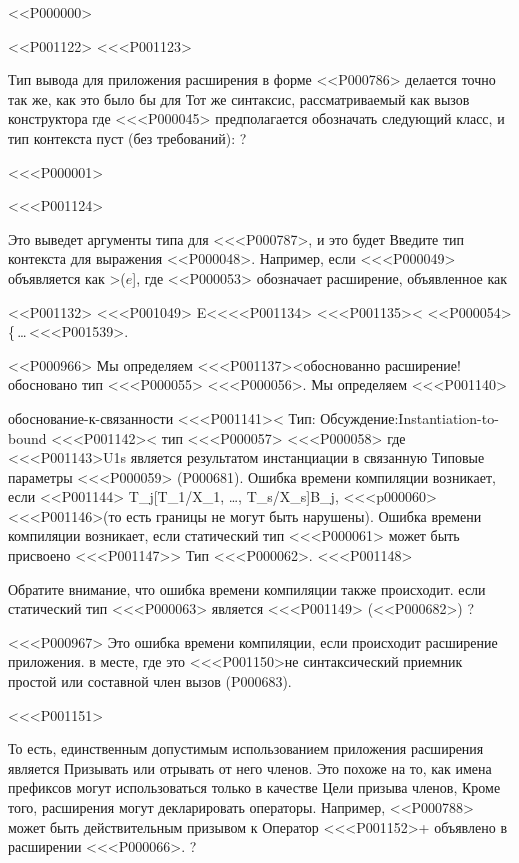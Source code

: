 {{{{{{{{{{{{{{{<<P000000>

<<P001122>
<<<P001123>{%
Тип вывода для приложения расширения
в форме <<P000786>
делается точно так же, как это было бы для
Тот же синтаксис, рассматриваемый как вызов конструктора
где <<<P000045> предполагается обозначать следующий класс,
и тип контекста пуст (без требований): %
?

<<<P000001>

<<<P001124>{%
Это выведет аргументы типа для <<<P000787>, и это будет
Введите тип контекста для выражения <<P000048>.
Например, если <<<P000049> объявляется как
>($e$],
где <<P000053> обозначает расширение, объявленное как

<<P001132>
<<<P001049>%
\EXTENSION{} E<<<<P001134> <<<P001135>< <<P000054> \{\,\ldots\,<<<P001539>.

<<P000966>%
Мы определяем
<<<P001137><обоснованно \ON{} {расширение!обосновано} \ON{} тип
<<<P000055> <<<P000056>.
Мы определяем
<<<P001140>{обоснование-к-связанности <<<P001141>< Тип: {%
Обсуждение:Instantiation-to-bound <<<P001142>< тип
<<<P000057> <<<P000058>
где <<<P001143>{U}{1}{s} является результатом инстанциации в связанную
Типовые параметры <<<P000059>
(P000681).
%
Ошибка времени компиляции возникает, если
<<P001144> T_j}{[T_1/X_1, \ldots, T_s/X_s]B_j},
<<<p000060>
<<<P001146>{(то есть границы не могут быть нарушены)}.
%
Ошибка времени компиляции возникает, если статический тип <<<P000061> может быть присвоено
<<<P001147>> Тип <<<P000062>.
<<<P001148>{%
Обратите внимание, что ошибка времени компиляции также происходит.
если статический тип <<<P000063> является <<<P001149>
(<<P000682>)%
?

<<<P000967>%
Это ошибка времени компиляции, если происходит расширение приложения.
в месте, где это <<<P001150>{не} синтаксический приемник
простой или составной член вызов
(P000683).

<<<P001151>{%
То есть, единственным допустимым использованием приложения расширения является
Призывать или отрывать от него членов.
Это похоже на то, как имена префиксов могут использоваться только в качестве
Цели призыва членов,
Кроме того, расширения могут декларировать операторы.
Например, <<P000788> может быть действительным призывом к
Оператор <<<P001152>{+} объявлено в расширении <<<P000066>.%
?

}}}}}}}}}}}}}}}}}}}}
